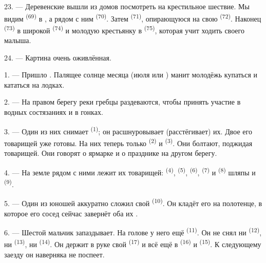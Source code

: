 23. --- Деревенские вышли из домов посмотреть на крестильное шествие.
Мы видим  \textsuperscript{(69)} в ,
а рядом с ним  \textsuperscript{(70)}. Затем 
\textsuperscript{(71)}, опирающуюся на свою  \textsuperscript{(72)}.
Наконец  \textsuperscript{(73)} в широкой  \textsuperscript{(74)} и молодую крестьянку в 
\textsuperscript{(75)}, которая учит ходить своего малыша.

24. --- Картина очень оживлённая.
\VUsaut{4.0mm}

\VUsaut{3.0mm}

\VUsaut{2.4mm}

\VUsaut{3.0mm}

1. --- Пришло . Палящее солнце месяца  (июля или
) манит молодёжь купаться и кататься на лодках.

2. --- На правом берегу реки гребцы раздеваются, чтобы принять участие в
водных состязаниях и в гонках.

3. --- Один из них снимает  \textsuperscript{(1)}; он
расшнуровывает (расстёгивает) их. Двое его товарищей уже готовы. На них
теперь только  \textsuperscript{(2)} и 
\textsuperscript{(3)}. Они болтают, поджидая товарищей. Они говорят о ярмарке
и о празднике на другом берегу.

4. --- На земле рядом с ними лежит  их товарищей:
  \textsuperscript{(4)}, 
\textsuperscript{(5)},  \textsuperscript{(6)}, 
\textsuperscript{(7)} и  \textsuperscript{(8)} шляпы и
 \textsuperscript{(9)}.

5. --- Один из юношей аккуратно сложил свой 
\textsuperscript{(10)}. Он кладёт его на полотенце, в которое его сосед сейчас
завернёт оба их .

6. --- Шестой мальчик запаздывает. На голове у него ещё 
\textsuperscript{(11)}. Он не снял ни  \textsuperscript{(12)}, ни
 \textsuperscript{(13)}, ни  \textsuperscript{(14)}.
Он держит в руке свой  \textsuperscript{(17)} и всё ещё в
 \textsuperscript{(16)} и  \textsuperscript{(15)}. К
следующему заезду он наверняка не поспеет.


